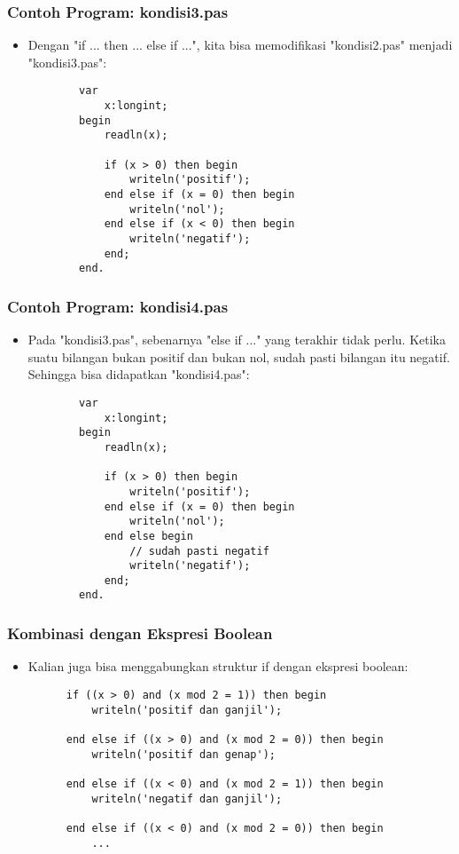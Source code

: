 \documentclass{beamer}
\begin{document}
\begin{frame}[fragile]
\frametitle{Contoh Program: kondisi3.pas}
\begin{itemize}
	\item Dengan "if ... then ... else if ...", kita bisa memodifikasi "kondisi2.pas" menjadi "kondisi3.pas":
	\begin{lstlisting}
		var
		    x:longint;
		begin
		    readln(x);
		
		    if (x > 0) then begin
		        writeln('positif');
		    end else if (x = 0) then begin
		        writeln('nol');
		    end else if (x < 0) then begin
		        writeln('negatif');
		    end;
		end.
	\end{lstlisting}
\end{itemize}
\end{frame}

\begin{frame}[fragile]
\frametitle{Contoh Program: kondisi4.pas}
\begin{itemize}
	\item Pada "kondisi3.pas", sebenarnya "else if ..." yang terakhir tidak perlu. Ketika suatu bilangan bukan positif dan bukan nol, sudah pasti bilangan itu negatif. Sehingga bisa didapatkan "kondisi4.pas":
	\begin{lstlisting}
		var
		    x:longint;
		begin
		    readln(x);
		
		    if (x > 0) then begin
		        writeln('positif');
		    end else if (x = 0) then begin
		        writeln('nol');
		    end else begin
		        // sudah pasti negatif
		        writeln('negatif');
		    end;
		end.
	\end{lstlisting}
\end{itemize}
\end{frame}

\begin{frame}[fragile]
\frametitle{Kombinasi dengan Ekspresi Boolean}
\begin{itemize}
	\item Kalian juga bisa menggabungkan struktur if dengan ekspresi boolean:
	\begin{lstlisting}
	  if ((x > 0) and (x mod 2 = 1)) then begin
	      writeln('positif dan ganjil');
	      
	  end else if ((x > 0) and (x mod 2 = 0)) then begin
	      writeln('positif dan genap');
	      
	  end else if ((x < 0) and (x mod 2 = 1)) then begin
	      writeln('negatif dan ganjil');
	      
	  end else if ((x < 0) and (x mod 2 = 0)) then begin
 	      ...
	\end{lstlisting}
\end{itemize}
\end{frame}
\end{document}
